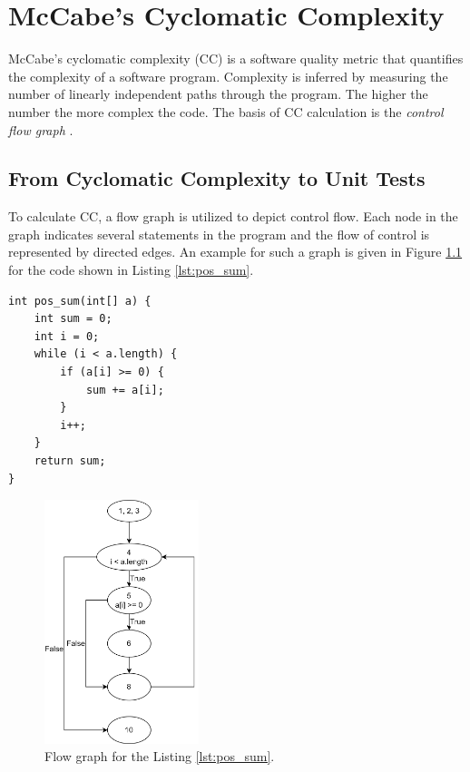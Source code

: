 \chapter{McCabe's Cyclomatic Complexity}
McCabe's cyclomatic complexity (CC) is a software quality metric that quantifies the complexity of a software program. Complexity is inferred by measuring the number of linearly independent paths through the program. The higher the number the more complex the code.
The basis of CC calculation is the \emph{control flow graph} \autocite{spillner2021software}.

\section{From Cyclomatic Complexity to Unit Tests}
To calculate CC, a flow graph is utilized to depict control flow. Each node in the graph indicates several statements in the program and the flow of control is represented by directed edges. An example for such a graph is given in Figure \ref{fig:flow-graph-eg} for the code shown in Listing \ref{lst:pos_sum}.

\begin{lstlisting}[caption={pos\_sum finds the sum of all positive numbers stored in an integer array a. Input parameter is a, an array of integers. The output of the function is sum, the sum of integers inside the array a.},label=lst:pos_sum]
int pos_sum(int[] a) {
    int sum = 0;
    int i = 0;
    while (i < a.length) {
        if (a[i] >= 0) {
            sum += a[i];
        }
        i++;
    }
    return sum;
}
\end{lstlisting}

\begin{figure}[H]
    \centering
    \includegraphics[width=0.4\textwidth]{images/flow-graph-eg.png}
    \caption{Flow graph for the Listing \ref{lst:pos_sum}.}
    \label{fig:flow-graph-eg}
\end{figure}

